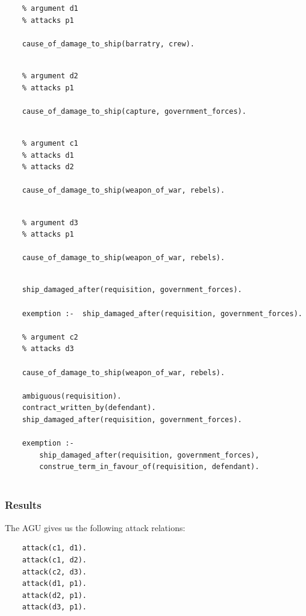 \begin{verbatim}
    % argument d1
    % attacks p1
    
    cause_of_damage_to_ship(barratry, crew).
    
\end{verbatim}
    
\begin{verbatim}
    % argument d2
    % attacks p1
    
    cause_of_damage_to_ship(capture, government_forces).
    
\end{verbatim}
    
\begin{verbatim}
    % argument c1
    % attacks d1
    % attacks d2
    
    cause_of_damage_to_ship(weapon_of_war, rebels).
    
\end{verbatim}
    
\begin{verbatim}
    % argument d3
    % attacks p1
    
    cause_of_damage_to_ship(weapon_of_war, rebels).
    
\end{verbatim}
    
\begin{verbatim}
    ship_damaged_after(requisition, government_forces).
    
    exemption :-  ship_damaged_after(requisition, government_forces).
    
    % argument c2
    % attacks d3
    
    cause_of_damage_to_ship(weapon_of_war, rebels).
    
    ambiguous(requisition).
    contract_written_by(defendant).
    ship_damaged_after(requisition, government_forces).
    
    exemption :-
        ship_damaged_after(requisition, government_forces),
        construe_term_in_favour_of(requisition, defendant).
 
\end{verbatim}

\subsubsection{Results}

The AGU gives us the following attack relations:

\begin{verbatim}
    attack(c1, d1).
    attack(c1, d2).
    attack(c2, d3).
    attack(d1, p1).
    attack(d2, p1).
    attack(d3, p1).
\end{verbatim}


